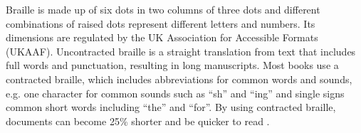 Braille is made up of six dots in two columns of three dots and different combinations of raised dots represent different letters and numbers.
Its dimensions are regulated by the UK Association for Accessible Formats (UKAAF). 
Uncontracted braille is a straight translation from text that includes full words and punctuation, resulting in long manuscripts.
Most books use a contracted braille, which includes abbreviations for common words and sounds, e.g. one character for common sounds such as ``sh'' and ``ing'' and single signs common short words including ``the'' and ``for''.
By using contracted braille, documents can become 25\% shorter and be quicker to read \cite{royal_national_institute_of_blind_people_braille_nodate,sense_braille_nodate}.